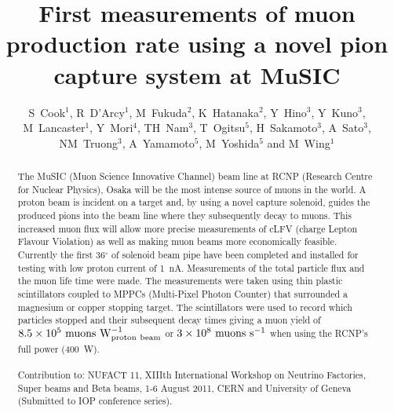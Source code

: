 \documentclass[a4paper]{jpconf}
\begin{document}
\title{First measurements of muon production rate using a novel pion capture system at MuSIC}

\author{S~Cook$^1$, R~D'Arcy$^1$, M~Fukuda$^2$, K~Hatanaka$^2$, Y~Hino$^3$, Y~Kuno$^3$, M~Lancaster$^1$, Y~Mori$^4$, TH~Nam$^3$, T~Ogitsu$^5$, H~Sakamoto$^3$, A~Sato$^3$, NM~Truong$^3$, A~Yamamoto$^5$, M~Yoshida$^5$ and M~Wing$^1$}

\address{$^1$Department of Physics and Astronomy, University College London, Gower Street, London WC1E~6BT, UK}
\address{$^2$Research Centre for Nuclear Physics, 10-1 Mihogaoka, Ibaraki, Osaka~567-0047, Japan}
\address{$^3$Department of Physics, Graduate School of Science, Osaka University, 1-1 Machikane, Toyonaka, Osaka 590-0043 Japan}
\address{$^4$Kyoto Research Reactor Institute, 2 Asashiro-Nishi, Kumatori-cho, Sennangu, Osaka 590-0494, Japan}
\address{$^5$High Energy Accelerator Research Organisation, KEK, 1-1 Oho, Tsukuba, Ibaragi 305-0801, Japan}


\begin{abstract}
The MuSIC (Muon Science Innovative Channel) beam line at RCNP (Research Centre for Nuclear Physics), Osaka will be the most intense source of muons in the world. A proton beam is incident on a target and, by using a novel capture solenoid, guides the produced pions into the beam line where they subsequently decay to muons. This increased muon flux will allow more precise measurements of cLFV (charge Lepton Flavour Violation) as well as making muon beams more economically feasible. Currently the first 36$^{\circ}$ of solenoid beam pipe have been completed and installed for testing with low proton current of 1~nA. Measurements of the total particle flux and the muon life time were made. The measurements were taken using thin plastic scintillators coupled to MPPCs (Multi-Pixel Photon Counter) that surrounded a magnesium or copper stopping target. The scintillators were used to record which particles stopped and their subsequent decay times giving a muon yield of $8.5\times 10^5 \rm{~muons} \rm{~W}^{-1}_{\rm{proton~beam}}$ or $3\times 10^8 \rm{~muons} \rm{~s}^{-1}$ when using the RCNP's full power (400~W).
\\
\\
Contribution to: NUFACT 11, XIIIth International Workshop on Neutrino Factories, Super beams and Beta beams, 1-6 August 2011, CERN and University of Geneva (Submitted to IOP conference series).

\end{abstract}    
\end{document}
